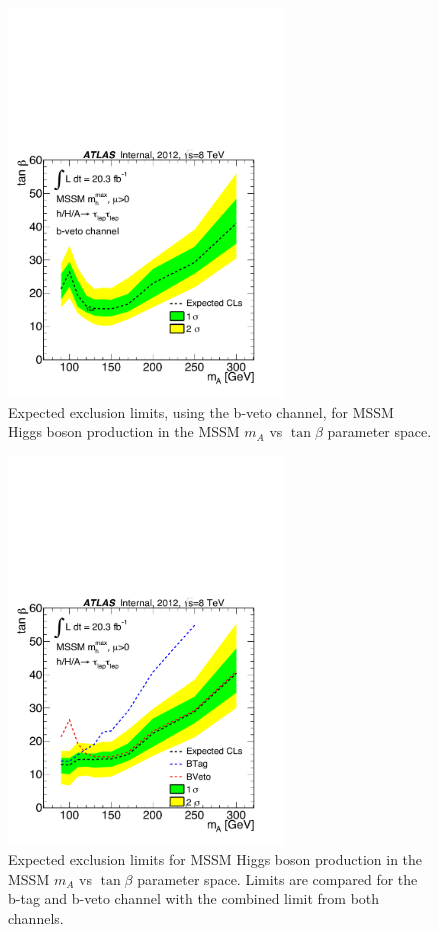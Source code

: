 \begin{figure}[]
  \centering
  \includegraphics[width=0.65\textwidth]{figure/limits/Limits_mAtanBeta_BVeto.pdf}
  \caption{Expected %
  exclusion limits, using the b-veto channel, for MSSM Higgs boson production 
in the MSSM $m_A$ vs $\tan\beta$ parameter space.}
\label{fig:limit_extract_combined}
\end{figure}

\begin{figure}[]
  \centering
  \includegraphics[width=0.65\textwidth]{figure/limits/Limits_mAtanBeta_CombChannels.pdf}
  \caption{Expected %
  exclusion limits for MSSM Higgs boson production 
in the MSSM $m_A$ vs $\tan\beta$ parameter space. Limits are compared for the b-tag and b-veto channel with the combined limit from both channels.}
\label{fig:limit_extract_combined}
\end{figure}



\clearpage
